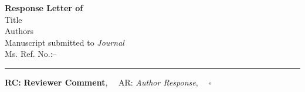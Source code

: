 \providecommand{\lettertitle}{Response Letter of}
\providecommand{\papertitle}{Title}
\providecommand{\authors}{Authors}
\providecommand{\journal}{Journal}
\providecommand{\paperid}{--}





{\Large\bf \lettertitle}\\[1em]
{\huge \papertitle}\\[1em]
{\authors}\\
Manuscript submitted to {\it \journal}\\
Ms. Ref. No.:\paperid\\
\hrule

\hfill {\bfseries RC:} \textbf{Reviewer Comment},\(\quad\) AR: \emph{Author Response}, \(\quad\square\) \emph{}